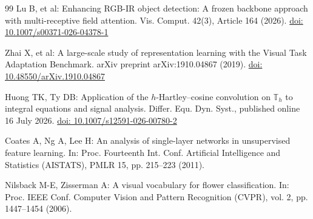 \documentclass[pdflatex,sn-mathphys-num]{sn-jnl}
\theoremstyle{thmstyleone}
\theoremstyle{thmstyletwo}
\theoremstyle{thmstylethree}
\begin{document}
\begin{thebibliography}{99}
Lu B, et al:
Enhancing RGB-IR object detection: A frozen backbone approach with multi-receptive field attention.
Vis. Comput. 42(3), Article 164 (2026).
\href{https://doi.org/10.1007/s00371-026-04378-1}{doi: 10.1007/s00371-026-04378-1}


Zhai X, et al:
A large-scale study of representation learning with the Visual Task Adaptation Benchmark.
arXiv preprint arXiv:1910.04867 (2019).
\href{https://doi.org/10.48550/arXiv.1910.04867}{doi: 10.48550/arXiv.1910.04867}

Huong TK, Ty DB:
Application of the $h$-Hartley--cosine convolution on $\mathbb{T}_h$ to integral equations and signal analysis.
Differ. Equ. Dyn. Syst., published online 16 July 2026.
\href{https://doi.org/10.1007/s12591-026-00780-2}
{doi: 10.1007/s12591-026-00780-2}


Coates A, Ng A, Lee H:
An analysis of single-layer networks in unsupervised feature learning.
In: Proc. Fourteenth Int. Conf. Artificial Intelligence and Statistics (AISTATS), PMLR 15, pp. 215--223 (2011).

Nilsback M-E, Zisserman A:
A visual vocabulary for flower classification.
In: Proc. IEEE Conf. Computer Vision and Pattern Recognition (CVPR), vol. 2, pp. 1447--1454 (2006).

\end{thebibliography}
\end{document}
